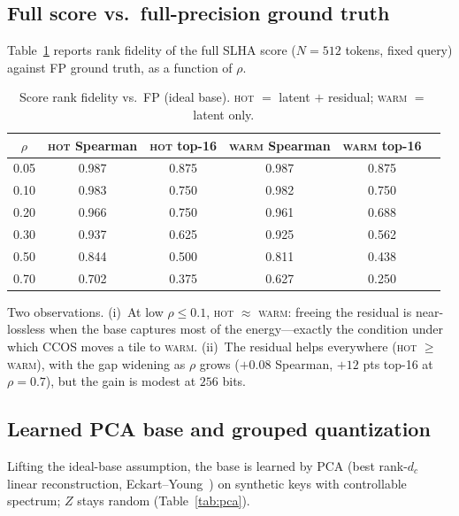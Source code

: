 \documentclass[11pt]{article}
\theoremstyle{plain}
\theoremstyle{definition}
\newcommand{\dc}{d_c}
\begin{document}
\subsection{Full score vs.\ full-precision ground truth}
\label{sec:scorefp}
Table~\ref{tab:scorefp} reports rank fidelity of the full SLHA score
($N=512$ tokens, fixed query) against FP ground truth, as a function of
$\rho$.

\begin{table}[t]
\centering
\caption{Score rank fidelity vs.\ FP (ideal base). \textsc{hot}
$=$ latent $+$ residual; \textsc{warm} $=$ latent only.}
\label{tab:scorefp}
\small
\begin{tabular}{@{}cccccc@{}}
\toprule
$\rho$ & \textsc{hot} Spearman & \textsc{hot} top-16 & \textsc{warm} Spearman & \textsc{warm} top-16 \\
\midrule
0.05 & 0.987 & 0.875 & 0.987 & 0.875 \\
0.10 & 0.983 & 0.750 & 0.982 & 0.750 \\
0.20 & 0.966 & 0.750 & 0.961 & 0.688 \\
0.30 & 0.937 & 0.625 & 0.925 & 0.562 \\
0.50 & 0.844 & 0.500 & 0.811 & 0.438 \\
0.70 & 0.702 & 0.375 & 0.627 & 0.250 \\
\bottomrule
\end{tabular}
\end{table}

Two observations. (i)~At low $\rho \le 0.1$, \textsc{hot} $\approx$
\textsc{warm}: freeing the residual is near-lossless when the base
captures most of the energy---exactly the condition under which CCOS
moves a tile to \textsc{warm}. (ii)~The residual helps everywhere
(\textsc{hot} $\ge$ \textsc{warm}), with the gap widening as $\rho$ grows
($+0.08$ Spearman, $+12$ pts top-16 at $\rho=0.7$), but the gain is
modest at $256$ bits.

\subsection{Learned PCA base and grouped quantization}
\label{sec:learned}
Lifting the ideal-base assumption, the base is learned by PCA
(best rank-$\dc$ linear reconstruction, Eckart--Young~\cite{eckartyoung})
on synthetic keys with controllable spectrum; $Z$ stays random
(Table~\ref{tab:pca}).
\end{document}
